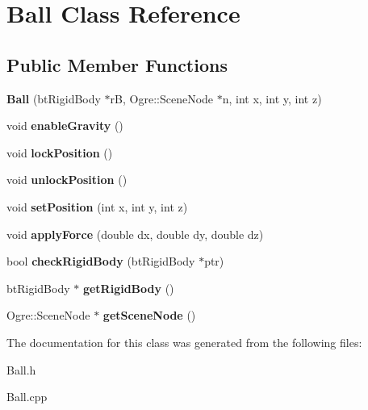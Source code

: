 \hypertarget{classBall}{\section{Ball Class Reference}
\label{classBall}
}
\subsection*{Public Member Functions}
\begin{DoxyCompactItemize}
\item 
\hypertarget{classBall_aec238435b8abb83b6459dc811be703b9}{{\bfseries Ball} (bt\-Rigid\-Body $\ast$r\-B, Ogre\-::\-Scene\-Node $\ast$n, int x, int y, int z)}\label{classBall_aec238435b8abb83b6459dc811be703b9}

\item 
\hypertarget{classBall_acc744032fcdb54f6555880296b899a1e}{void {\bfseries enable\-Gravity} ()}\label{classBall_acc744032fcdb54f6555880296b899a1e}

\item 
\hypertarget{classBall_aca417b802b8bd765d6a06adc64b4cd1c}{void {\bfseries lock\-Position} ()}\label{classBall_aca417b802b8bd765d6a06adc64b4cd1c}

\item 
\hypertarget{classBall_ab4ad64bcaa75353124023b924de9ff98}{void {\bfseries unlock\-Position} ()}\label{classBall_ab4ad64bcaa75353124023b924de9ff98}

\item 
\hypertarget{classBall_afe626f0cd58bb4e6e604f18be11ae6ca}{void {\bfseries set\-Position} (int x, int y, int z)}\label{classBall_afe626f0cd58bb4e6e604f18be11ae6ca}

\item 
\hypertarget{classBall_a8560c24afa515d3319cdf08dd918bf82}{void {\bfseries apply\-Force} (double dx, double dy, double dz)}\label{classBall_a8560c24afa515d3319cdf08dd918bf82}

\item 
\hypertarget{classBall_a6364b72dcbf707a3ff649fdf731936d4}{bool {\bfseries check\-Rigid\-Body} (bt\-Rigid\-Body $\ast$ptr)}\label{classBall_a6364b72dcbf707a3ff649fdf731936d4}

\item 
\hypertarget{classBall_a0dde8c947575a2f2edb671ef02326c50}{bt\-Rigid\-Body $\ast$ {\bfseries get\-Rigid\-Body} ()}\label{classBall_a0dde8c947575a2f2edb671ef02326c50}

\item 
\hypertarget{classBall_a80897cd66327c7b8664b5416021c9f12}{Ogre\-::\-Scene\-Node $\ast$ {\bfseries get\-Scene\-Node} ()}\label{classBall_a80897cd66327c7b8664b5416021c9f12}

\end{DoxyCompactItemize}


The documentation for this class was generated from the following files\-:\begin{DoxyCompactItemize}
\item 
Ball.\-h\item 
Ball.\-cpp\end{DoxyCompactItemize}
